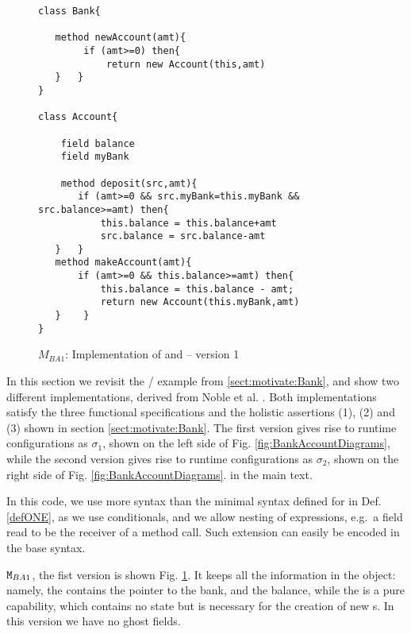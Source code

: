 \begin{figure}[thb]
\begin{lstlisting}
class Bank{

   method newAccount(amt){
        if (amt>=0) then{
            return new Account(this,amt)
   }   }
}

class Account{

    field balance
    field myBank
    
    method deposit(src,amt){
       if (amt>=0 && src.myBank=this.myBank && src.balance>=amt) then{
           this.balance = this.balance+amt
           src.balance = src.balance-amt
   }   }
   method makeAccount(amt){
       if (amt>=0 && this.balance>=amt) then{
           this.balance = this.balance - amt;
           return new Account(this.myBank,amt)
   }    }
}
\end{lstlisting}
 \vspace*{-7mm}
\caption{$M_{BA1}$: Implementation of  and  -- version 1}
\label{fig:BanAccImplV1}
\end{figure}

In this section we revisit the / example from
  \ref{sect:motivate:Bank}, 
 and show two different
 implementations, derived from Noble et al. \cite{arnd18} . 
 Both implementations  satisfy the three functional specifications and the holistic assertions
 (1), (2) and (3)  shown in section  \ref{sect:motivate:Bank}.
 The first version gives rise to runtime configurations as $\sigma_1$, 
 shown on the left side of Fig.   \ref{fig:BankAccountDiagrams}, 
 while the
 second version gives rise to runtime configurations as $\sigma_2$,
 shown on the right side of Fig.   \ref{fig:BankAccountDiagrams}. 
 in the main text.

 In this code, we use more syntax than the minimal syntax defined for \LangOO in Def. \ref{defONE}, as we use conditionals, and we allow nesting of expressions, e.g.\ a field read to be the receiver of a method call. Such extension can easily be encoded in the base syntax.

${\mbox{\tt{\ensuremath{{\mbox{\tt{M}}}}}}}_{BA1}$, the fist version is shown Fig. \ref{fig:BanAccImplV1}. It keeps all the information in the  object: namely,
the  contains the pointer to the bank, and the balance, while the  is a pure capability, which contains
no state but is necessary for the creation of new s.
In this version we have no ghost fields.

